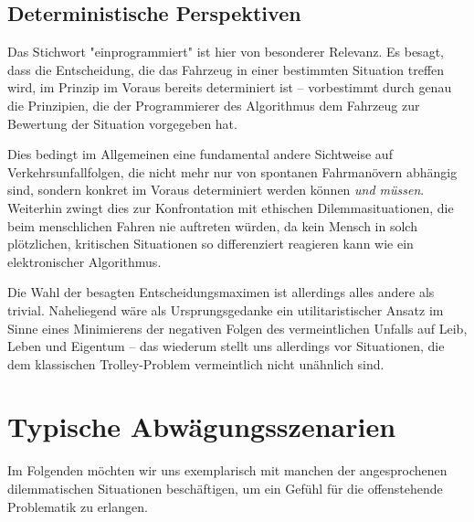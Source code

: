 \documentclass[twocolumn, german]{tum-article}
\begin{document}
\subsection{Deterministische Perspektiven}
Das Stichwort "einprogrammiert" ist hier von besonderer Relevanz.
Es besagt, dass die Entscheidung, die das Fahrzeug in einer bestimmten Situation treffen wird, im Prinzip im Voraus bereits determiniert ist -- vorbestimmt durch genau die Prinzipien, die der Programmierer des Algorithmus dem Fahrzeug zur Bewertung der Situation vorgegeben hat. 

Dies bedingt im Allgemeinen eine fundamental andere Sichtweise auf Verkehrsunfallfolgen, die nicht mehr nur von spontanen Fahrmanövern abhängig sind, sondern konkret im Voraus determiniert werden können \textit{und müssen}.
Weiterhin zwingt dies zur Konfrontation mit ethischen Dilemmasituationen, die beim menschlichen Fahren nie auftreten würden, da kein Mensch in solch plötzlichen, kritischen Situationen so differenziert reagieren kann wie ein elektronischer Algorithmus.

Die Wahl der besagten Entscheidungsmaximen ist allerdings alles andere als trivial.
Naheliegend wäre als Ursprungsgedanke ein utilitaristischer Ansatz im Sinne eines Minimierens der negativen Folgen des vermeintlichen Unfalls auf Leib, Leben und Eigentum --
das wiederum stellt uns allerdings vor Situationen, die dem klassischen Trolley-Problem vermeintlich nicht unähnlich sind.


\section{Typische Abwägungsszenarien}
Im Folgenden möchten wir uns exemplarisch mit manchen der angesprochenen dilemmatischen Situationen beschäftigen, um ein Gefühl für die offenstehende Problematik zu erlangen.
\end{document}
